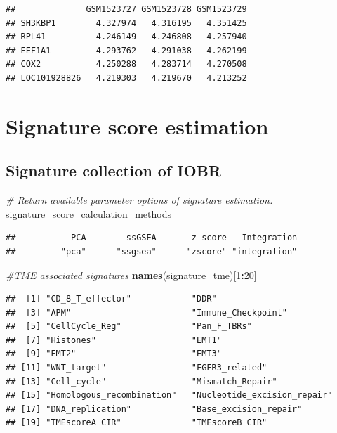 \documentclass[
  12pt,
]{book}
\newenvironment{Shaded}{\begin{snugshade}}{\end{snugshade}}
\newcommand{\CommentTok}[1]{\textcolor[rgb]{0.56,0.35,0.01}{\textit{#1}}}
\newcommand{\DecValTok}[1]{\textcolor[rgb]{0.00,0.00,0.81}{#1}}
\newcommand{\FunctionTok}[1]{\textcolor[rgb]{0.13,0.29,0.53}{\textbf{#1}}}
\newcommand{\NormalTok}[1]{#1}
\newcommand{\SpecialCharTok}[1]{\textcolor[rgb]{0.81,0.36,0.00}{\textbf{#1}}}
\theoremstyle{definition}
\theoremstyle{definition}
\theoremstyle{definition}
\theoremstyle{definition}
\theoremstyle{remark}
\begin{document}
\begin{verbatim}
##              GSM1523727 GSM1523728 GSM1523729
## SH3KBP1        4.327974   4.316195   4.351425
## RPL41          4.246149   4.246808   4.257940
## EEF1A1         4.293762   4.291038   4.262199
## COX2           4.250288   4.283714   4.270508
## LOC101928826   4.219303   4.219670   4.213252
\end{verbatim}

\hypertarget{signature-score-estimation}{%
\section{Signature score estimation}\label{signature-score-estimation}}

\hypertarget{signature-collection-of-iobr}{%
\subsection{Signature collection of IOBR}\label{signature-collection-of-iobr}}

\begin{Shaded}
\begin{Highlighting}[]
\CommentTok{\# Return available parameter options of signature estimation.}
\NormalTok{signature\_score\_calculation\_methods}
\end{Highlighting}
\end{Shaded}

\begin{verbatim}
##           PCA        ssGSEA       z-score   Integration 
##         "pca"      "ssgsea"      "zscore" "integration"
\end{verbatim}

\begin{Shaded}
\begin{Highlighting}[]
\CommentTok{\#TME associated signatures}
\FunctionTok{names}\NormalTok{(signature\_tme)[}\DecValTok{1}\SpecialCharTok{:}\DecValTok{20}\NormalTok{]}
\end{Highlighting}
\end{Shaded}

\begin{verbatim}
##  [1] "CD_8_T_effector"            "DDR"                       
##  [3] "APM"                        "Immune_Checkpoint"         
##  [5] "CellCycle_Reg"              "Pan_F_TBRs"                
##  [7] "Histones"                   "EMT1"                      
##  [9] "EMT2"                       "EMT3"                      
## [11] "WNT_target"                 "FGFR3_related"             
## [13] "Cell_cycle"                 "Mismatch_Repair"           
## [15] "Homologous_recombination"   "Nucleotide_excision_repair"
## [17] "DNA_replication"            "Base_excision_repair"      
## [19] "TMEscoreA_CIR"              "TMEscoreB_CIR"
\end{verbatim}
\end{document}
